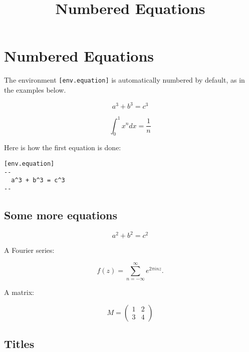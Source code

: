 \documentclass[11pt]{amsart}
\title{Numbered Equations}
\author{}
\date{}
\begin{document}
\maketitle
\section*{\hypertarget{_numbered_equations}{Numbered Equations}}

The environment {\tt [env.equation]} is automatically
numbered by default, as in the examples below.


\begin{equation*}
a^3 + b^3 = c^3
\end{equation*}


\begin{equation*}
\int_0^1 x^n dx = \frac{1}{n}
\end{equation*}


Here is how the first equation is done:


\begin{verbatim}
[env.equation]
--
  a^3 + b^3 = c^3
--
\end{verbatim}

\subsection*{\hypertarget{_some_more_equations}{Some more equations}}

\begin{equation}
\label{pyth}a^2  + b^2 = c^2
\end{equation}


A Fourier series:


\begin{equation}
\label{fourier}f(z)  = \sum_{n=-\infty}^\infty e^{2\pi i n z }.
\end{equation}


A matrix:


\begin{equation}
\label{eq-matrix}M = \left(
\begin{matrix}
1 & 2 \\
3 & 4
\end{matrix}
\right)
\end{equation}




\subsection*{\hypertarget{_titles}{Titles}}
\end{document}
